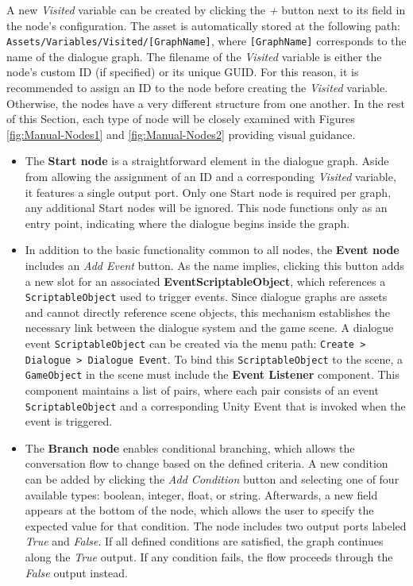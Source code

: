 A new \textit{Visited} variable can be created by clicking the \textit{+} button next to its field in the node's configuration. The asset is automatically stored at the following path: \verb|Assets/Variables/Visited/[GraphName]|, where \verb|[GraphName]| corresponds to the name of the dialogue graph. The filename of the \textit{Visited} variable is either the node’s custom ID (if specified) or its unique GUID. For this reason, it is recommended to assign an ID to the node before creating the \textit{Visited} variable. Otherwise, the nodes have a very different structure from one another. In the rest of this Section, each type of node will be closely examined with Figures \ref{fig:Manual-Nodes1} and \ref{fig:Manual-Nodes2} providing visual guidance.

\begin{itemize}
    \item The \textbf{Start node }is a straightforward element in the dialogue graph. Aside from allowing the assignment of an ID and a corresponding \textit{Visited} variable, it features a single output port. Only one Start node is required per graph, any additional Start nodes will be ignored. This node functions only as an entry point, indicating where the dialogue begins inside the graph.
    \item In addition to the basic functionality common to all nodes, the \textbf{Event node} includes an \textit{Add Event} button. As the name implies, clicking this button adds a new slot for an associated \textbf{EventScriptableObject}, which references a \verb|ScriptableObject| used to trigger events. Since dialogue graphs are assets and cannot directly reference scene objects, this mechanism establishes the necessary link between the dialogue system and the game scene. A dialogue event \verb|ScriptableObject| can be created via the menu path: \verb|Create > Dialogue > Dialogue Event|. To bind this \verb|ScriptableObject| to the scene, a \verb|GameObject| in the scene must include the \textbf{Event Listener} component. This component maintains a list of pairs, where each pair consists of an event \verb|ScriptableObject| and a corresponding Unity Event that is invoked when the event is triggered. 
    \item The \textbf{Branch node} enables conditional branching, which allows the conversation flow to change based on the defined criteria. A new condition can be added by clicking the \textit{Add Condition} button and selecting one of four available types: boolean, integer, float, or string. Afterwards, a new field appears at the bottom of the node, which allows the user to specify the expected value for that condition. The node includes two output ports labeled \textit{True} and \textit{False}. If all defined conditions are satisfied, the graph continues along the \textit{True} output. If any condition fails, the flow proceeds through the \textit{False} output instead. 

\end{itemize}
